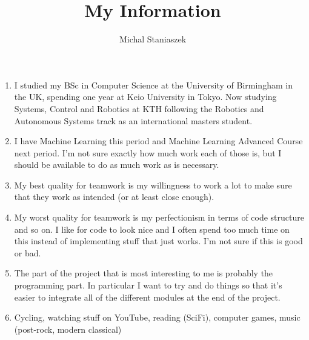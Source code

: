 \documentclass[10pt,a4paper]{article}
\author{Michal Staniaszek}
\title{My Information}
\begin{document}
\maketitle

\begin{enumerate}
\item I studied my BSc in Computer Science at the University of Birmingham in
  the UK, spending one year at Keio University in Tokyo. Now studying Systems,
  Control and Robotics at KTH following the Robotics and Autonomous Systems
  track as an international masters student.
\item I have Machine Learning this period and Machine Learning Advanced Course
  next period. I'm not sure exactly how much work each of those is, but I should
  be available to do as much work as is necessary.
\item My best quality for teamwork is my willingness to work a lot to make sure
  that they work as intended (or at least close enough).
\item My worst quality for teamwork is my perfectionism in terms of code
  structure and so on. I like for code to look nice and I often spend too much
  time on this instead of implementing stuff that just works. I'm not sure if
  this is good or bad.
\item The part of the project that is most interesting to me is probably
  the programming part. In particular I want to try and do things so that it's
  easier to integrate all of the different modules at the end of the project.
\item Cycling, watching stuff on YouTube, reading (SciFi), computer games, music
  (post-rock, modern classical)

\end{enumerate}
\end{document}
